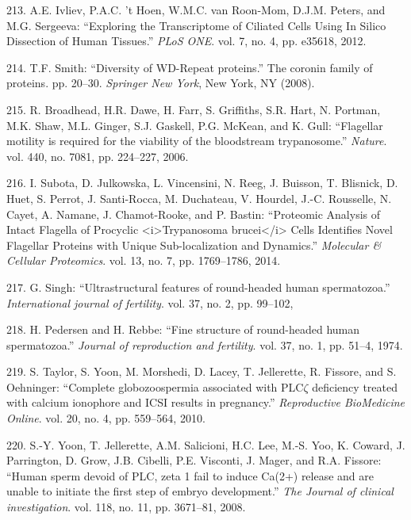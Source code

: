 \documentclass[12pt,a4paper,twoside]{ugathesis}
\theoremstyle{definition}
\theoremstyle{definition}
\theoremstyle{definition}
\theoremstyle{remark}
\begin{document}
\hypertarget{ref-Ivliev2012}{}
213. A.E. Ivliev, P.A.C. 't Hoen, W.M.C. van Roon-Mom, D.J.M. Peters,
and M.G. Sergeeva: ``Exploring the Transcriptome of Ciliated Cells Using
In Silico Dissection of Human Tissues.'' \emph{PLoS ONE}. vol. 7, no. 4,
pp. e35618, 2012.

\hypertarget{ref-Smith2008}{}
214. T.F. Smith: ``Diversity of WD-Repeat proteins.'' The coronin family
of proteins. pp. 20--30. \emph{Springer New York}, New York, NY (2008).

\hypertarget{ref-Broadhead2006}{}
215. R. Broadhead, H.R. Dawe, H. Farr, S. Griffiths, S.R. Hart, N.
Portman, M.K. Shaw, M.L. Ginger, S.J. Gaskell, P.G. McKean, and K. Gull:
``Flagellar motility is required for the viability of the bloodstream
trypanosome.'' \emph{Nature}. vol. 440, no. 7081, pp. 224--227, 2006.

\hypertarget{ref-Subota2014}{}
216. I. Subota, D. Julkowska, L. Vincensini, N. Reeg, J. Buisson, T.
Blisnick, D. Huet, S. Perrot, J. Santi-Rocca, M. Duchateau, V. Hourdel,
J.-C. Rousselle, N. Cayet, A. Namane, J. Chamot-Rooke, and P. Bastin:
``Proteomic Analysis of Intact Flagella of Procyclic
\textless{}i\textgreater{}Trypanosoma brucei\textless{}/i\textgreater{}
Cells Identifies Novel Flagellar Proteins with Unique Sub-localization
and Dynamics.'' \emph{Molecular \& Cellular Proteomics}. vol. 13, no. 7,
pp. 1769--1786, 2014.

\hypertarget{ref-Singh}{}
217. G. Singh: ``Ultrastructural features of round-headed human
spermatozoa.'' \emph{International journal of fertility}. vol. 37, no.
2, pp. 99--102,

\hypertarget{ref-Pedersen1974}{}
218. H. Pedersen and H. Rebbe: ``Fine structure of round-headed human
spermatozoa.'' \emph{Journal of reproduction and fertility}. vol. 37,
no. 1, pp. 51--4, 1974.

\hypertarget{ref-Taylor2010}{}
219. S. Taylor, S. Yoon, M. Morshedi, D. Lacey, T. Jellerette, R.
Fissore, and S. Oehninger: ``Complete globozoospermia associated with
PLC\(\zeta\) deficiency treated with calcium ionophore and ICSI results
in pregnancy.'' \emph{Reproductive BioMedicine Online}. vol. 20, no. 4,
pp. 559--564, 2010.

\hypertarget{ref-Yoon2008}{}
220. S.-Y. Yoon, T. Jellerette, A.M. Salicioni, H.C. Lee, M.-S. Yoo, K.
Coward, J. Parrington, D. Grow, J.B. Cibelli, P.E. Visconti, J. Mager,
and R.A. Fissore: ``Human sperm devoid of PLC, zeta 1 fail to induce
Ca(2+) release and are unable to initiate the first step of embryo
development.'' \emph{The Journal of clinical investigation}. vol. 118,
no. 11, pp. 3671--81, 2008.
\end{document}
